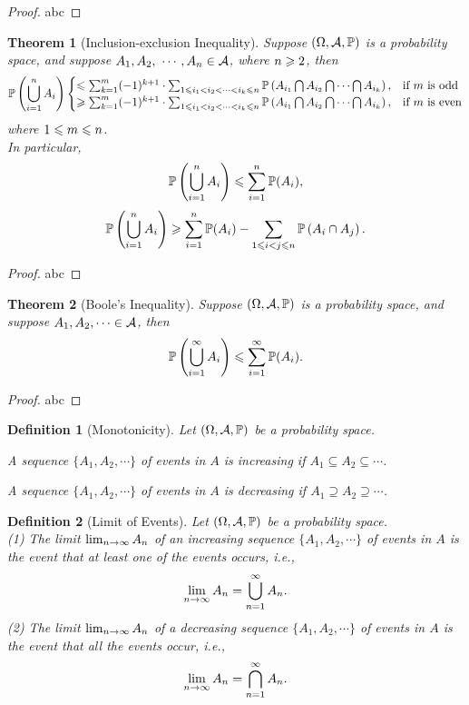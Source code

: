 \documentclass[openany,12pt]{book}
\newtheorem{theorem}{Theorem}[chapter]
\newtheorem{definition}{Definition}[chapter]
\begin{document}
\begin{proof}
  abc
\end{proof}

\begin{theorem}[Inclusion-exclusion Inequality]
Suppose $(\Omega,\mathcal{A},\mathbb{P})$ is a probability space, and suppose $A_1,A_2,\ \cdots,A_n\in\ma$, where $n\geqslant2$, then
$$\mathbb{P}\left(\bigcup_{i=1}^n A_i \right)
\begin{cases}
\leqslant\sum_{k=1}^m(-1)^{k+1}\cdot  \sum_{1\leqslant i_1<i_2<\cdots<i_k\leqslant n}\mathbb{P}\left(A_{i_1} \bigcap A_{i_2 } \bigcap\cdots\bigcap A_{i_k } \right),& \text{if $m$ is odd}\\
\geqslant\sum_{k=1}^m(-1)^{k+1}\cdot  \sum_{1\leqslant i_1<i_2<\cdots<i_k\leqslant n}\mathbb{P}\left(A_{i_1} \bigcap A_{i_2 } \bigcap\cdots\bigcap A_{i_k } \right),& \text{if $m$ is even}
\end{cases}
$$
where $1\leqslant m\leqslant n$.\\
In particular,
$$\mathbb{P}\left(\bigcup_{i=1}^n A_i \right)\leqslant\sum_{i=1}^{n} \mathbb{P}(A_i),$$
$$\mathbb{P}\left(\bigcup_{i=1}^n A_i \right)\geqslant\sum_{i=1}^{n} \mathbb{P}(A_i)-
\sum_{1\leqslant i<j\leqslant n}\mathbb{P}\left(A_i\cap A_j\right).$$
\end{theorem}

\begin{proof}
  abc
\end{proof}

\begin{theorem}[Boole's Inequality]
Suppose $(\Omega,\mathcal{A},\mathbb{P})$ is a probability space, and suppose $A_1,A_2,\cdots\in\mathcal{A}$, then 
$$\mathbb{P}\left(\bigcup_{i=1}^\infty A_i \right)\leqslant\sum_{i=1}^\infty \mathbb{P}(A_i ).$$
\end{theorem}

\begin{proof}
  abc
\end{proof}

\begin{definition}[Monotonicity]
  Let $(\Omega,\mathcal{A},\mathbb{P})$ be a probability space.

  A sequence $\{A_1,A_2,\cdots\}$ of events in $A$ is increasing if $A_1\subseteq A_2\subseteq\cdots$.

  A sequence $\{A_1,A_2,\cdots\}$ of events in $A$ is decreasing if $A_1\supseteq A_2\supseteq\cdots$.
\end{definition}

\begin{definition}[Limit of Events]
Let $(\Omega,\mathcal{A},\mathbb{P})$ be a probability space.\\
(1) The limit $\lim_{n\to\infty} A_n$ of an increasing sequence $\{A_1,A_2,\cdots\}$ of events in $A$ is the event that at least one of the events occurs, i.e., $$\lim_{n\to\infty} A_n=\bigcup_{n=1}^\infty A_n.$$
(2) The limit $\lim_{n\to\infty} A_n$ of a decreasing sequence $\{A_1,A_2,\cdots\}$ of events in $A$ is the event that all the events occur, i.e., $$\lim_{n\to\infty} A_n=\bigcap_{n=1}^\infty A_n.$$
\end{definition}
\end{document}
